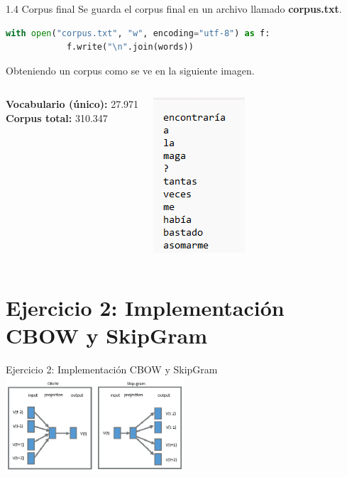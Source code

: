 \documentclass{beamer}
\begin{document}
	
\begin{frame}[fragile]{1.4 Corpus final}
	\justifying
	Se guarda el corpus final en un archivo llamado \textbf{corpus.txt}.
	
	\begin{lstlisting}[language=Python]
		with open("corpus.txt", "w", encoding="utf-8") as f:
			f.write("\n".join(words))
	\end{lstlisting}
	
	Obteniendo un corpus como se ve en la siguiente imagen.
	\vspace{0.1cm}
\begin{columns}[t] %
	\textbf{Vocabulario (único):} 27.971\\
	\textbf{Corpus total:} 310.347
	
	\includegraphics[width=0.5\linewidth]{corpus_txt.png}
\end{columns}

\end{frame}


\section{Ejercicio 2: Implementación CBOW y SkipGram}

\begin{frame}{}
	\centering
	\Large Ejercicio 2: Implementación CBOW y SkipGram\\
	\vspace{0.8cm}
	\includegraphics[width=0.5\textwidth]{imagenes_cbow_skipgram}
\end{frame}
\end{document}
